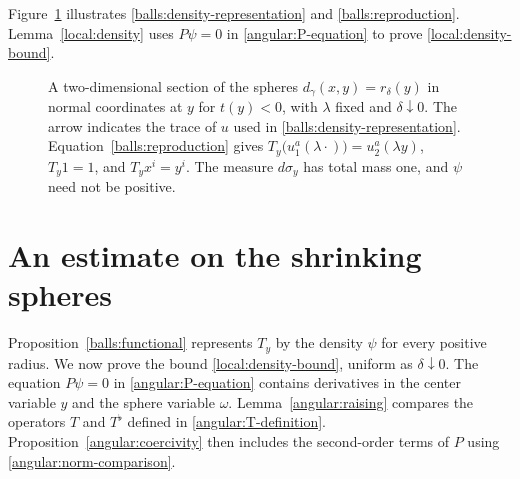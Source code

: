 \documentclass[11pt,a4paper]{article}
\theoremstyle{definition}
\theoremstyle{remark}
\numberwithin{equation}{section}
\begin{document}
Figure~\ref{fig:shrinking-functional} illustrates
\eqref{balls:density-representation} and \eqref{balls:reproduction}.
Lemma~\ref{local:density} uses $P\psi=0$ in \eqref{angular:P-equation}
to prove \eqref{local:density-bound}.
\begin{figure}[htbp]
\centering
{}
\caption{A two-dimensional section of the spheres
$d_\gamma(x,y)=r_\delta(y)$ in normal coordinates at $y$ for $t(y)<0$,
with $\lambda$ fixed and $\delta\downarrow0$.
The arrow indicates the trace of $u$ used in
\eqref{balls:density-representation}. Equation~\eqref{balls:reproduction}
gives $T_y\bigl(u_1^a(\lambda\cdot)\bigr)=u_2^a(\lambda y)$,
$T_y1=1$, and $T_yx^i=y^i$.
The measure $d\sigma_y$ has total mass one, and $\psi$ need not be positive.}
\label{fig:shrinking-functional}
\end{figure}
\section{An estimate on the shrinking spheres}
\label{sec:angular}

Proposition~\ref{balls:functional} represents $T_y$ by the density
$\psi$ for every positive radius.
We now prove the bound \eqref{local:density-bound}, uniform as
$\delta\downarrow0$.
The equation $P\psi=0$ in \eqref{angular:P-equation} contains
derivatives in the center variable $y$ and the sphere variable $\omega$.
Lemma~\ref{angular:raising} compares the operators $T$ and $T^\flat$
defined in \eqref{angular:T-definition}.
Proposition~\ref{angular:coercivity} then includes the second-order
terms of $P$ using \eqref{angular:norm-comparison}.
\end{document}
